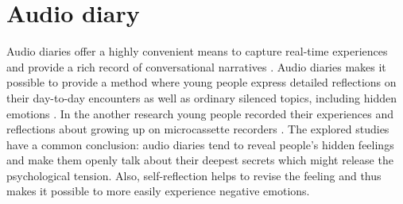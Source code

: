 \section{Audio diary}
Audio diaries offer a highly convenient means to capture real-time experiences and provide a rich record of conversational narratives \cite{sawhney2018audio}. 
Audio diaries makes it possible to provide a method where young people express detailed reflections on their day-to-day encounters as well as ordinary silenced topics, including hidden emotions \cite{mupambireyi2019reflections}.  In the another research young people recorded their experiences and reflections about growing up on microcassette recorders \cite{worth2009making}. The explored studies have a common conclusion: audio diaries tend to reveal people's hidden feelings and make them openly talk about their deepest secrets which might release the psychological tension. Also, self-reflection helps to revise the feeling and thus makes it possible to more easily experience negative emotions.